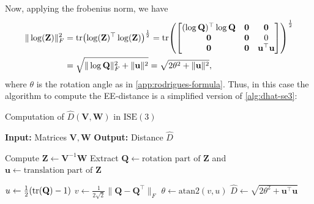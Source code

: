 Now, applying the frobenius norm, we have
\begin{align}
    \|\log(\mathbf{Z})\|_F^2 &= \operatorname{tr}\bigl(\log(\mathbf{Z})^\top\log(\mathbf{Z})\bigr)^\frac{1}{2} = \operatorname{tr}\!\left(\begin{bmatrix}
        (\log\mathbf{Q})^\top\log\mathbf{Q} & \mathbf{0} & \mathbf{0}\\
        \mathbf{0} & \mathbf{0} & 0\\
        \mathbf{0} & \mathbf{0} & \mathbf{u}^\top\mathbf{u}
    \end{bmatrix}\right)^\frac{1}{2} \\
    &= \sqrt{\|\log\mathbf{Q}\|_F^2 + \|\mathbf{u}\|^2} = \sqrt{2\theta^2 + \|\mathbf{u}\|^2},
\end{align}
where $\theta$ is the rotation angle as in \cref{app:rodrigues-formula}. Thus, in this case the algorithm to compute the EE-distance is a simplified version of \cref{alg:dhat-se3}:
\begin{algorithm}
    \caption{Computation of $\widehat{D}(\mathbf{V}, \mathbf{W})$ in $\text{ISE}(3)$}
    \begin{algorithmic}[1]\label{alg:dhat-ise3}
        \Statex \textbf{Input:} Matrices $\mathbf{V}, \mathbf{W}$
        \Statex \textbf{Output:} Distance $\widehat{D}$
        
        \State Compute $\mathbf{Z} \gets \mathbf{V}^{-1}\mathbf{W}$
        \State Extract $\mathbf{Q} \gets \text{rotation part of } \mathbf{Z}$ and $\mathbf{u} \gets \text{translation part of } \mathbf{Z}$

        \State $u \gets \frac{1}{2} (\operatorname{tr}(\mathbf{Q}) - 1)$
        \State $v \gets \frac{1}{2\sqrt{2}} \|\mathbf{Q} - \mathbf{Q}^\top\|_F$
        \State $\theta \gets \text{atan2}(v, u)$
        \State $\widehat{D} \gets \sqrt{2\theta^2 + \mathbf{u}^\top\mathbf{u}}$
    \end{algorithmic}
\end{algorithm}


